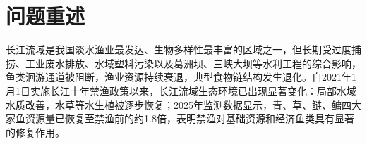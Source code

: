\documentclass{MMCStyle}
\begin{document}
\begin{abstract}
长江十年禁渔实施后，四大家鱼资源量回升，长江江豚和长江鲟种群亦呈恢复态势，但资源枯竭、江湖连通性受阻、水体污染与外来物种入侵等问题仍较突出。围绕"资源恢复能否稳定转化为生态系统健康改善"核心问题，本文分别描述流域平均食物网、珍稀物种响应和三级食物链的长期行为，再用综合情景评价比较污染与入侵压力下能够保留的禁渔收益。

问题一在流域平均尺度上配对四类基础资源与四大家鱼功能群。以2025年四大家鱼资源量恢复至禁渔前1.8倍作单参数标定，湖北江段单网次渔获量提升120\%留作局地对照。结果显示，2025年四大家鱼总生物量为禁渔前的1.805倍，单位捕捞努力量渔获量($\mathrm{CPUE}^*$)为1.838倍；摄食压力指数升至4.213，基础资源量末值降至0.204。鱼类回升早于底层资源恢复。

问题二把上游资源--鱼群轨迹压缩为综合生态状态指数，用它调节中层猎物承载力，并设置高阻隔、无人工放流和污染情景。基线下长江江豚与长江鲟末值为1.133倍和1.140倍，高阻隔时降至0.901倍和0.856倍；取消人工放流后长江鲟降至0.519倍，污染情景下两者为0.610倍和0.704倍。对照结果显示，通道阻隔同时压低两类物种，放流变化的主要响应落在长江鲟。

长期行为部分采用同一Hastings-Powell三级食物链。参数$K$增大时，代表点$K=1.795$、$2.665$、$4.800$的峰谷差和峰间隔离散程度随之增大，轨道由规则振荡转为复杂非线性波动。短时间窗分析显示，首个连续正李雅普诺夫指数区间位于$K=3.2186$附近；75组扩展测试中，仅5组在$K=3.20\sim3.22$区间保留由负转正的跨越。故本文仅报告"系统动力学复杂性随承载力提高而增强"的方向性结论。

综合评价取积分后期的饵料资源、长江江豚、长江鲟和入侵压力指标，并用熵权与CRITIC平均权重计算情景得分。三种情景依次得到0.662、0.423和0.155；2000次局部参数扰动无一改变排序，稳定率为100\%。这一顺序与"水体污染首先削弱禁渔收益，外来物种入侵进一步导致系统状态恶化"相对应。

十年禁渔后，鱼类资源已经回升，但资源恢复不会自动转化为系统整体健康改善：模型中的底层资源、珍稀物种和长期轨道变化幅度各异。若不同步推进水质治理、江湖连通性修复、珍稀物种定向放流与入侵防控，恢复收益仍可能在向高营养级传递和多重压力叠加时减弱。
\end{abstract}

\section{问题重述}
长江流域是我国淡水渔业最发达、生物多样性最丰富的区域之一，但长期受过度捕捞、工业废水排放、水域塑料污染以及葛洲坝、三峡大坝等水利工程的综合影响，鱼类洄游通道被阻断，渔业资源持续衰退，典型食物链结构发生退化。自2021年1月1日实施长江十年禁渔政策以来，长江流域生态环境已出现显著变化：局部水域水质改善，水草等水生植被逐步恢复；2025年监测数据显示，青、草、鲢、鳙四大家鱼资源量已恢复至禁渔前的约1.8倍，表明禁渔对基础资源和经济鱼类具有显著的修复作用。
\end{document}
